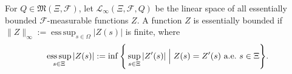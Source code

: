 \documentclass[final,onefignum,onetabnum]{class}
\DeclareMathOperator*{\esssup}{ess\,sup}
\newcommand{\Bs}[1]{\mathbb{#1}} %
\newcommand{\Cs}[1]{\mathcal{#1}} %
\newcommand{\Fs}[1]{\mathfrak{#1}} %
\newcommand{\measurespace}{\left( \Xi, \Cs{F} \right)}
\newcommand{\Pspace}[1]{\left( \Xi, \Cs{F}, #1 \right)}
\begin{document}

For  $Q \in \Fs{M}\measurespace$, let $\Cs{L}_{\infty}\Pspace{Q}$
be the linear space of all essentially bounded $\Cs{F}$-measurable functions  $Z$. A function $Z$ is essentially bounded if  \linebreak $ \|Z\|_{\infty}:=\esssup_{s \in \Omega} |Z(s)|$ is finite, where 
$$\esssup_{s \in \Xi} |Z(s)|:=\inf\Bigg\{\sup_{s \in \Xi} |Z^{\prime}(s)| \; \Big| \linebreak \; Z(s)=Z^{\prime}(s) \ \text{a.e.} \ s \in \Xi \Bigg\}.$$ %
\end{document}
